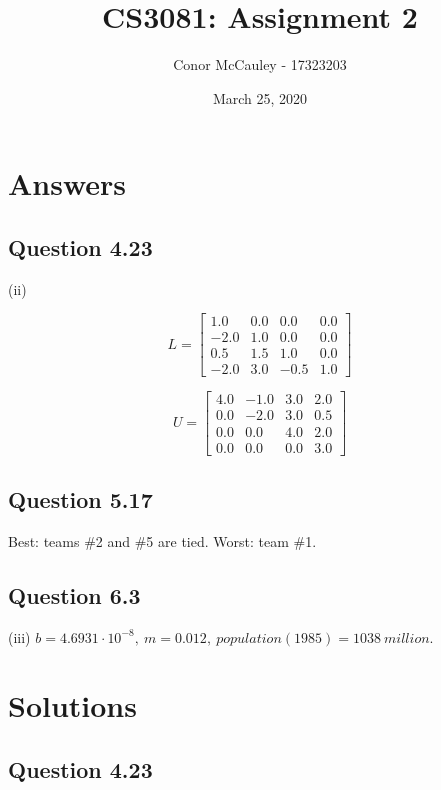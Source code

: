 \documentclass[12pt]{article}
\title{CS3081: Assignment 2}
\author{Conor McCauley - 17323203}
\date{March 25, 2020}
\begin{document}
\maketitle

\section*{Answers}

\subsection*{Question 4.23}

\noindent (ii)

$$
L =
\begin{bmatrix}
    1.0 & 0.0 & 0.0 & 0.0\\
    -2.0 & 1.0 & 0.0 & 0.0\\
    0.5 & 1.5 & 1.0 & 0.0\\
    -2.0 & 3.0 & -0.5 & 1.0
\end{bmatrix}
$$

$$
U =
\begin{bmatrix}
    4.0 & -1.0 & 3.0 & 2.0\\
    0.0 & -2.0 & 3.0 & 0.5\\
    0.0 & 0.0 & 4.0 & 2.0\\
    0.0 & 0.0 & 0.0 & 3.0
\end{bmatrix}
$$

\subsection*{Question 5.17}

\noindent Best: teams \#2 and \#5 are tied. Worst: team \#1.

\subsection*{Question 6.3}

\noindent (iii) $b = 4.6931 \cdot 10^{-8}, \: m = 0.012, \: population(1985) = 1038 \: million$.

\section*{Solutions}

\subsection*{Question 4.23}
\end{document}
